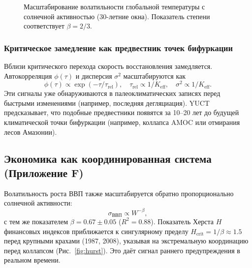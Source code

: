 \documentclass[12pt,a4paper]{article}
\newcommand{\Keff}{K_{\mathrm{eff}}}
\begin{document}
	\begin{figure}[H]
		\centering
		\caption{Масштабирование волатильности глобальной температуры с солнечной активностью (30-летние окна).
			Показатель степени соответствует $\beta = 2/3$.}
		\label{fig:climate_scaling}
	\end{figure}
	
	\subsubsection{Критическое замедление как предвестник точек бифуркации}
	
	Вблизи критического перехода скорость восстановления замедляется. Автокорреляция
	$\phi(\tau)$ и дисперсия $\sigma^2$ масштабируются как
	\[
	\phi(\tau) \propto \exp(-\tau/\tau_{\text{rel}}),\quad
	\tau_{\text{rel}} \propto 1/\Keff,\quad
	\sigma^2 \propto 1/\Keff.
	\]
	Эти сигналы уже обнаруживаются в палеоклиматических записях перед быстрыми изменениями
	(например, последняя дегляциация). YUCT предсказывает, что подобные предвестники появятся
	за 10–20 лет до будущей климатической точки бифуркации (например, коллапса AMOC или
	отмирания лесов Амазонии).
	
	\subsection{Экономика как координированная система (Приложение F)}
	
	Волатильность роста ВВП также масштабируется обратно пропорционально солнечной активности:
	\[
	\sigma_{\text{ВВП}} \propto W^{-\beta},
	\]
	с тем же показателем $\beta = 0.67 \pm 0.05$ ($R^2 = 0.88$). Показатель Херста $H$
	финансовых индексов приближается к сингулярному пределу $H_{\text{crit}} = 1/\beta \approx 1.5$
	перед крупными крахами (1987, 2008), указывая на экстремальную координацию перед коллапсом
	(Рис.~\ref{fig:hurst}). Это даёт сигнал раннего предупреждения в реальном времени.
	
\end{document}
